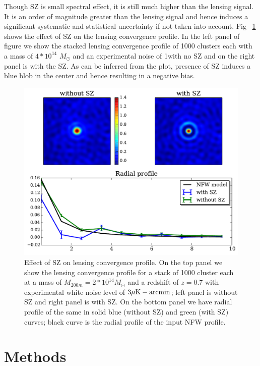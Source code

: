  Though SZ is small spectral effect, it is still much higher than the lensing signal. 
 It is an order of magnitude greater than the lensing signal and hence induces a significant systematic and statistical uncertainty if not taken into account. 
 Fig ~\ref{fig:SZ_effect} shows the effect of SZ on the lensing convergence profile. 
 In the left panel of figure we show the stacked lensing convergence profile of 1000 clusters each with a mass of $4*10^{14}$ $M_{\odot}$ and an experimental noise of 1\ukam with no SZ and on the right panel is with the SZ.  
 As can be inferred from the plot, presence of SZ induces a blue blob in the center and hence resulting in a negative bias.
 \begin{figure}
\includegraphics[width=\linewidth]{figs/tSZ_effect_on_lensing.pdf}
\caption{Effect of SZ on lensing convergence profile. On the top panel we show the lensing convergence profile for a stack of 1000 cluster each at a mass of $M_{200m}= 2*10^{14}  M_{\odot}$ and a redshift of $z = 0.7$ with experimental white noise level of $3\mu{\rm K-arcmin}$; left panel is without SZ and right panel is with SZ. On the bottom panel we have radial profile of the same in solid blue (without SZ) and green (with SZ) curves; black curve is the radial profile of the input NFW profile. }
\label{fig:SZ_effect}
\end{figure}



\section{Methods}
\label{sec_method}
